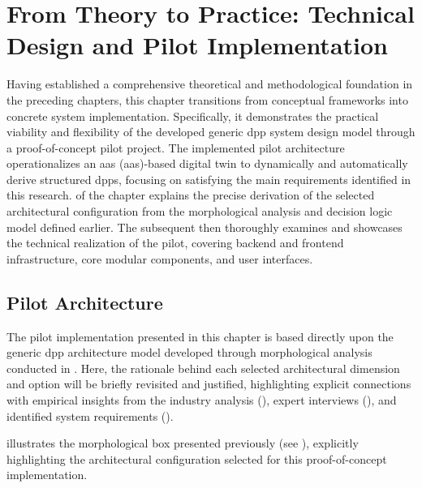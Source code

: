 \chapter{From Theory to Practice: Technical Design and Pilot Implementation}
\label{cha:chapter_5}

Having established a comprehensive theoretical and methodological foundation in the preceding chapters, this chapter transitions from conceptual frameworks into concrete system implementation. Specifically, it demonstrates the practical viability and flexibility of the developed generic \ac{dpp} system design model through a proof-of-concept pilot project. The implemented pilot architecture operationalizes an \acrlong{aas} (\acrshort{aas})-based digital twin to dynamically and automatically derive structured \ac{dpp}s, focusing on satisfying the main requirements identified in this research.  of the chapter explains the precise derivation of the selected architectural configuration from the morphological analysis and decision logic model defined earlier. The subsequent  then thoroughly examines and showcases the technical realization of the pilot, covering backend and frontend infrastructure, core modular components, and user interfaces.

\section{Pilot Architecture}
\label{sec:pilot_architecture}
The pilot implementation presented in this chapter is based directly upon the generic \ac{dpp} architecture model developed through morphological analysis conducted in . Here, the rationale behind each selected architectural dimension and option will be briefly revisited and justified, highlighting explicit connections with empirical insights from the industry analysis (), expert interviews (), and identified system requirements ().

 illustrates the morphological box presented previously (see ), explicitly highlighting the architectural configuration selected for this proof-of-concept implementation.


